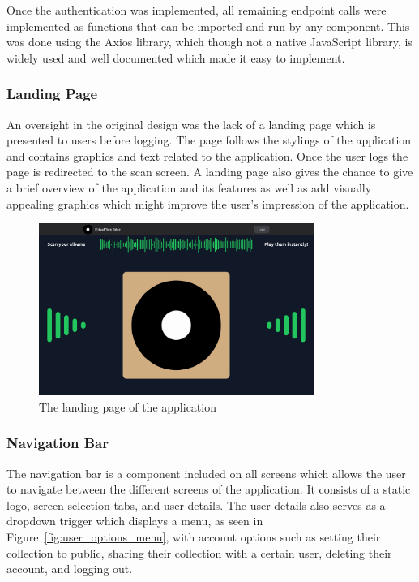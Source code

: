 Once the authentication was implemented, all remaining endpoint calls were implemented as functions that can be imported and run by any component. This was done using the Axios library, which though not a native JavaScript library, is widely used and well documented which made it easy to implement.

\subsubsection{Landing Page}
An oversight in the original design was the lack of a landing page which is presented to users before logging. The page follows the stylings of the application and contains graphics and text related to the application. Once the user logs the page is redirected to the scan screen. A landing page also gives the chance to give a brief overview of the application and its features as well as add visually appealing graphics which might improve the user's impression of the application.

\begin{figure} [H]
    \centering
    \includegraphics[width=0.8\textwidth]{figures/landing_page.png}
    \caption{The landing page of the application}
    \label{fig:landing_page}
\end{figure}


\subsubsection{Navigation Bar}
The navigation bar is a component included on all screens which allows the user to navigate between the different screens of the application. It consists of a static logo, screen selection tabs, and user details. The user details also serves as a dropdown trigger which displays a menu, as seen in Figure~\ref{fig:user_options_menu}, with account options such as setting their collection to public, sharing their collection with a certain user, deleting their account, and logging out.

